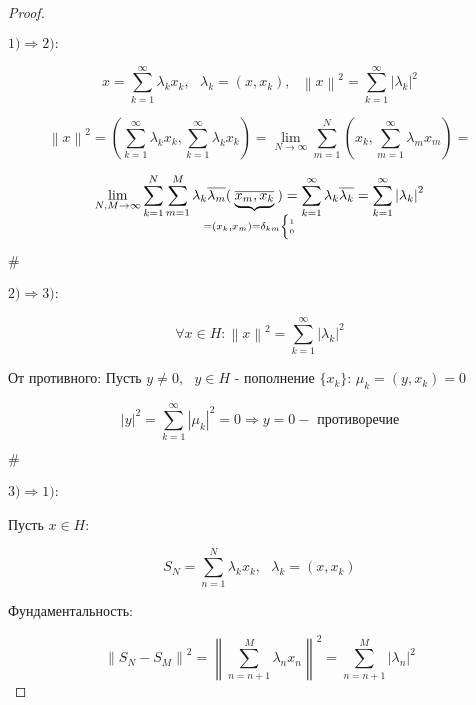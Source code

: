 \documentclass[12pt, a4paper]{report}
\begin{document}
\begin{proof}
    \[  \] 

    \( 1) \Rightarrow  2): \) 

    \[ x = \sum_{k =1} ^{ \infty  } \lambda_k x_k , \text{ } \lambda_k = (x,x_k) , \text{ }  \left\lVert x  \right\rVert    ^2 = \sum_{k =1}^{\infty  } \left\lvert \lambda_k \right\rvert  ^2  \] 

    \[ \left\lVert  x  \right\rVert ^2 = \left(  \sum_{k =1} ^{ \infty  } \lambda_k x_k, \sum_{k =1} ^{ \infty  } \lambda_k x_k  \right) = \lim_{N \to \infty} \sum_{m=1}^{N } \left( x_k, \sum_{m =1} ^{\infty } \lambda_m x_m \right) =\] 

    \[ \lim_{N,M  \to \infty}  \sum_{k =1}^{ N } \sum_{m =1}^{ M }  \lambda_k \overline{\lambda_m } (\kern-20pt \underbrace{\overline{x_m, x_k}}_{= (x_k, x_m) =\delta_{km}  {\tiny\begin{cases} 1 \\ 0 \end{cases}}}\kern-20pt  )  = \sum_{k =1} ^{ \infty  } \lambda_k \overline{\lambda_k } = \sum_{k =1} ^{ \infty  } \left\lvert \lambda_k \right\rvert  ^2  \] 

    \begin{flushright}
        \(  \# \) 
    \end{flushright}

    \( 2) \Rightarrow 3) \):

    \[ \forall  x \in  H : \left\lVert  x  \right\rVert  ^2 = \sum_{k =1}^{\infty  } \left\lvert \lambda_k \right\rvert ^2   \] 

    От противного: Пусть \( y \neq 0 , \text{ } y \in  H \)  - пополнение \( \{x_k\} \): \( \mu_k = (y, x_k) = 0 \) 

    \[ \left\lvert y  \right\rvert  ^2 = \sum_{k =1} ^{\infty  } \left\lvert \mu_k \right\rvert ^2 = 0 \Rightarrow y = 0 - \text{ противоречие}  \] 

    \begin{flushright}
        \(  \# \) 
    \end{flushright}

    \( 3) \Rightarrow 1) \):

    Пусть \( x \in  H  \): 

    \[  S_N = \sum_{n =1}^{N }  \lambda_k x_k , \text{ } \lambda_k = (x, x_k)  \] 

    Фундаментальность: 

    \[ \left\lVert S_N - S_M         \right\rVert  ^2 = \left\lVert \sum_{n =n +1 } ^{M } \lambda_n x_n           \right\rVert ^2 = \sum _{n =n +1 } ^{M } \left\lvert \lambda_n \right\rvert ^2 \] 


\end{proof}
\end{document}
